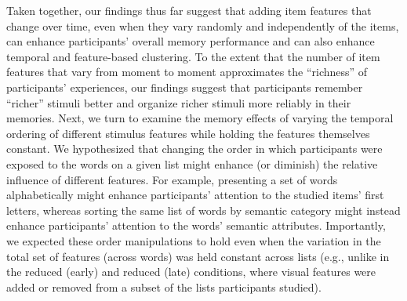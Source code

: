 \documentclass[11pt]{article}
\begin{document}
Taken together, our findings thus far suggest that adding item features that
change over time, even when they vary randomly and independently of the items,
can enhance participants' overall memory performance and can also enhance
temporal and feature-based clustering. To the extent that the number of item
features that vary from moment to moment approximates the ``richness'' of
participants' experiences, our findings suggest that participants remember
``richer'' stimuli better and organize richer stimuli more reliably in their
memories. Next, we turn to examine the memory effects of varying the temporal
ordering of different stimulus features while holding the features themselves
constant. We hypothesized that changing the order in which participants were
exposed to the words on a given list might enhance (or diminish) the relative
influence of different features. For example, presenting a set of words
alphabetically might enhance participants' attention to the studied items'
first letters, whereas sorting the same list of words by semantic category
might instead enhance participants' attention to the words' semantic
attributes. Importantly, we expected these order manipulations to hold even
when the variation in the total set of features (across words) was held
constant across lists (e.g., unlike in the reduced (early) and reduced (late)
conditions, where visual features were added or removed from a subset of the
lists participants studied).
\end{document}
